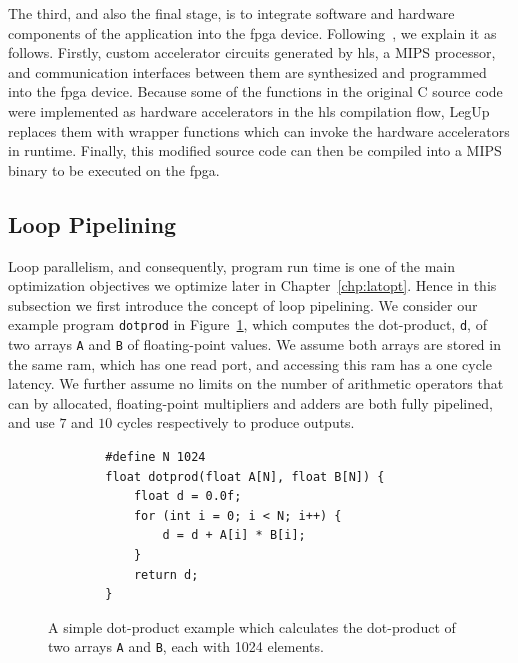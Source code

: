 The third, and also the final stage, is to integrate software and
hardware components of the application into the \gls{fpga} device.
Following~\cite{canis13}, we explain it as follows.  Firstly, custom
accelerator circuits generated by \gls{hls}, a MIPS processor, and
communication interfaces between them are synthesized and programmed into the
\gls{fpga} device.  Because some of the functions in the original C source
code were implemented as hardware accelerators in the \gls{hls} compilation
flow, LegUp replaces them with wrapper functions which can invoke the hardware
accelerators in runtime.  Finally, this modified source code can then be
compiled into a MIPS binary to be executed on the \gls{fpga}\@.


\subsection{Loop Pipelining}
\label{bg:sub:pipelining}

Loop parallelism, and consequently, program run time is one of the main
optimization objectives we optimize later in Chapter~\ref{chp:latopt}.  Hence
in this subsection we first introduce the concept of loop pipelining.  We
consider our example program \verb|dotprod| in Figure~\ref{bg:lst:dotprod},
which computes the dot-product, \verb|d|, of two arrays \verb|A| and \verb|B|
of floating-point values.  We assume both arrays are stored in the same
\gls{ram}, which has one read port, and accessing this \gls{ram} has a one
cycle latency.  We further assume no limits on the number of arithmetic
operators that can by allocated, floating-point multipliers and adders are both
fully pipelined, and use $7$ and $10$ cycles respectively to produce outputs.
\begin{figure}[ht]
    \centering
    \begin{lstlisting}
        #define N 1024
        float dotprod(float A[N], float B[N]) {
            float d = 0.0f;
            for (int i = 0; i < N; i++) {
                d = d + A[i] * B[i];
            }
            return d;
        }
    \end{lstlisting}
    \caption{%
        A simple dot-product example which calculates the dot-product of two
        arrays \texttt{A} and \texttt{B}, each with 1024 elements.
    }\label{bg:lst:dotprod}
\end{figure}

